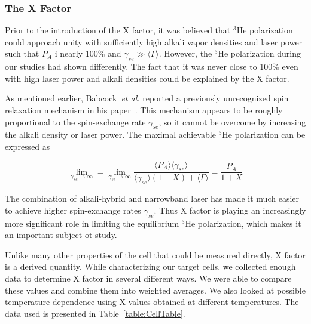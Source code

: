 \subsubsection{The X Factor}

Prior to the introduction of the X factor, it was believed that $^{3}$He polarization could approach unity with sufficiently high alkali vapor densities and laser power such that $P_{A}$ i nearly 100\% and $\gamma_{se} \gg \langle \Gamma \rangle$. However, the $^{3}$He polarization during our studies had shown differently. The fact that it was never close to 100\% even with high laser power and alkali densities could be explained by the X factor.

As mentioned earlier, Babcock~\emph{et al.} reported a previously unrecognized spin relaxation mechanism in his paper~\cite{PhysRevLett.96.083003}. This mechanism appears to be roughly proportional to the spin-exchange rate $\gamma_{se}$, so it cannot be overcome by increasing the alkali density or laser power. The maximal achievable $^{3}$He polarization can be expressed as

\begin{equation}
\lim_{\gamma_{se}\to\infty}=\lim_{\gamma_{se}\to\infty}\frac{\langle P_{A}\rangle\langle \gamma_{se}\rangle}{\langle\gamma_{se}\rangle(1+X)+\langle\Gamma\rangle}=\frac{P_{A}}{1+X}
\end{equation}

The combination of alkali-hybrid and narrowband laser has made it much easier to achieve higher spin-exchange rates $\gamma_{se}$. Thus X factor is playing an increasingly more significant role in limiting the equilibrium $^{3}$He polarization, which makes it an important subject ot study.

Unlike many other properties of the cell that could be measured directly, X factor is a derived quantity. While characterizing our target cells, we collected enough data to determine X factor in several different ways. We were able to compare these values and combine them into weighted averages. We also looked at possible temperature dependence using X values obtained at different temperatures. The data used is presented in Table~\ref{table:CellTable}.


